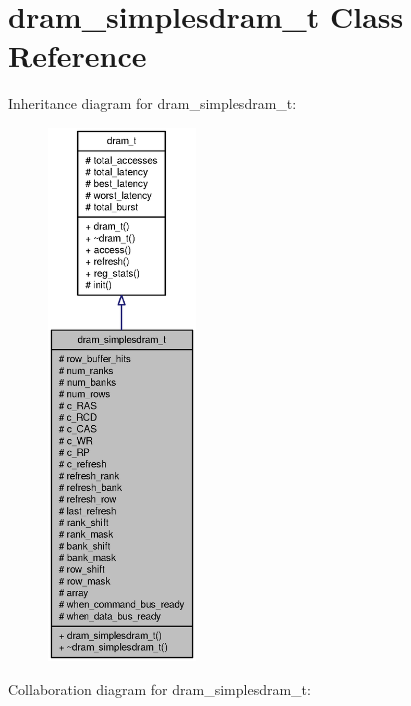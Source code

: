 \section{dram\_\-simplesdram\_\-t Class Reference}
\label{classdram__simplesdram__t}
Inheritance diagram for dram\_\-simplesdram\_\-t:\nopagebreak
\begin{figure}[H]
\begin{center}
\leavevmode
\includegraphics[height=400pt]{classdram__simplesdram__t__inherit__graph}
\end{center}
\end{figure}
Collaboration diagram for dram\_\-simplesdram\_\-t:\nopagebreak
